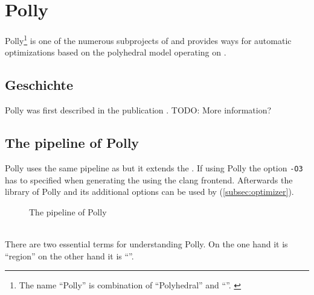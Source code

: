 \chapter{Polly}
Polly\footnote{The name \enquote{Polly} is combination of \enquote{Polyhedral} and \enquote{\llvm}. \cite{PollyGrosser}} is one of the numerous subprojects of \llvm and provides ways for automatic optimizations based on the polyhedral model operating on \llvmir.

\section{Geschichte}
Polly was first described in the publication \cite{PollyGrosser}. TODO: More information?

\section{The pipeline of Polly}
Polly uses the same pipeline as \llvm but it extends the \opt. If using Polly the option \texttt{-O3} has to specified when generating the \llvmir using the clang frontend.
Afterwards the library of Polly and its additional options can be used by \opt (\autoref{subsec:optimizer}).
\begin{figure}[h]
    \caption[The pipeline of Polly]{The pipeline of Polly \cite{PollyPresentation}}
    \centering
\end{figure}\\
There are two essential terms for understanding Polly. On the one hand it is \enquote{region} on the other hand it is \enquote{\scop}.
